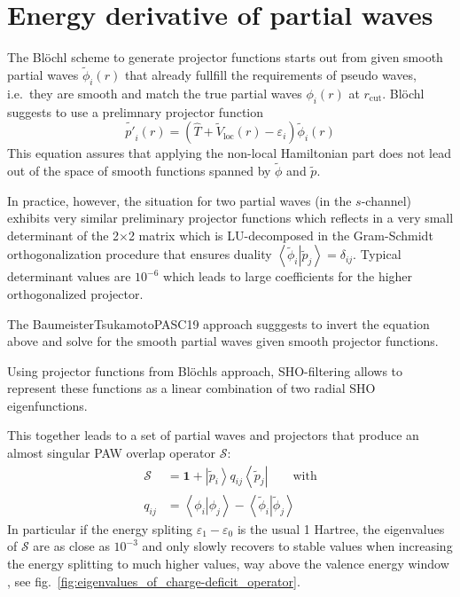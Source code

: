 \documentclass[oribibl]{llncs}
\newcommand{\um}[1]{_{\mathrm{#1}}}
\newcommand{\ket}[1]{\left| #1 \right\rangle}
\newcommand{\bra}[1]{\left\langle #1 \right|}
\newcommand{\braket}[2]{\left\langle \left. #1 \right| #2 \right\rangle}
\begin{document}
\section*{Energy derivative of partial waves}
The Bl\"{o}chl scheme to generate projector functions starts out from given smooth partial waves
$\tilde{\phi}_i(r)$ that already fullfill the requirements of pseudo waves, i.e.~they 
are smooth and match the true partial waves $\phi_i(r)$ at $r\um{cut}$. 
Bl\"{o}chl suggests to use a prelimnary projector function
\begin{equation}
  \tilde{p'}_i(r) = \left( \hat T + \tilde{V}\um{loc}(r) - \varepsilon_i \right) \tilde{\phi}_i(r)
\end{equation}
This equation assures that applying the non-local Hamiltonian part does not lead out of
the space of smooth functions spanned by $\tilde{\phi}$ and $\tilde{p}$.

In practice, however, the situation for two partial waves (in the $s$-channel) exhibits
very similar preliminary projector functions which reflects in a very small determinant
of the 2$\times$2 matrix which is LU-decomposed in the Gram-Schmidt orthogonalization procedure
that ensures duality $\braket{\tilde{\phi}_i}{\tilde{p}_j} = \delta_{ij}$.
Typical determinant values are $10^{-6}$ which leads to large coefficients for the
higher orthogonalized projector.

The BaumeisterTsukamotoPASC19 approach sugggests to invert the equation above
and solve for the smooth partial waves given smooth projector functions.

Using projector functions from Bl\"{o}chls approach, \ac{SHO}-filtering allows to represent
these functions as a linear combination of two radial \ac{SHO} eigenfunctions.

This together leads to a set of partial waves and projectors
that produce an almost singular \ac{PAW} overlap operator $\mathcal S$:
\begin{align}
  \mathcal S &= \mathbf 1  + \ket{\tilde{p}_i} q_{ij} \bra{\tilde{p}_j} \qquad \text{with}
  \\ q_{ij} &= \braket{\phi_i}{\phi_j} - \braket{\tilde\phi_i}{\tilde\phi_j}
\end{align}
In particular if the energy spliting $\varepsilon_1 - \varepsilon_0$ is the usual 1 Hartree,
the eigenvalues of $\mathcal S$ are as close as $10^{-3}$ and only slowly recovers to stable values
when increasing the energy splitting to much higher values, way above the valence energy window
, see fig.~\ref{fig:eigenvalues_of_charge-deficit_operator}.
\end{document}
